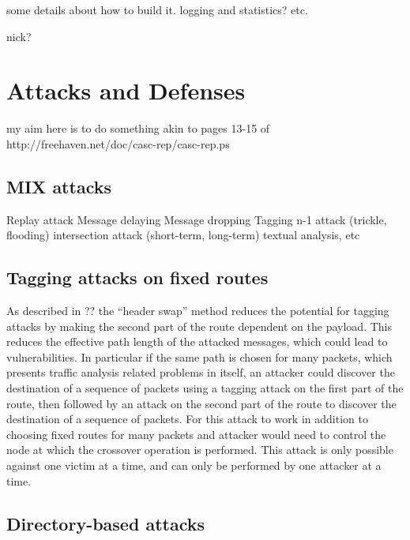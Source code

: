 \documentclass{llncs}
\begin{document}
some details about how to build it. logging and statistics? etc.

nick?


\section{Attacks and Defenses}
\label{sec:attacks}

my aim here is to do something akin to pages 13-15 of
http://freehaven.net/doc/casc-rep/casc-rep.ps

\subsection{MIX attacks}
\label{subsec:mix-attacks}

Replay attack
Message delaying
Message dropping
Tagging
n-1 attack (trickle, flooding)
intersection attack (short-term, long-term)
textual analysis, etc

\subsection{Tagging attacks on fixed routes}

As described in ?? the ``header swap'' method reduces the potential
for tagging attacks by making the second part of the route dependent
on the payload. This reduces the effective path length of the attacked
messages, which could lead to vulnerabilities. In particular if the
same path is chosen for many packets, which presents traffic analysis
related problems in itself, an attacker could discover the destination
of a sequence of packets using a tagging attack on the first part of
the route, then followed by an attack on the second part of the route
to discover the destination of a sequence of packets. For this attack to
work in addition to choosing fixed routes for many packets and attacker
would need to control the node at which the crossover operation is
performed. This attack is only possible against one victim at a time,
and can only be performed by one attacker at a time.




\subsection{Directory-based attacks}
\label{subsec:attacks-dirbased}
\end{document}
